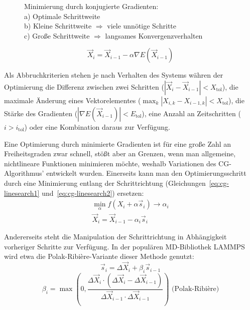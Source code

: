 \begin{figure}
  \centering
  \def\svgwidth{0.5\textwidth}
  
  \caption[Minimierung durch Konjugierte Gradienten]{
    Minimierung durch konjugierte Gradienten:\\
    a) Optimale Schrittweite\\
    b) Kleine Schrittweite $\Rightarrow$ viele unnötige Schritte\\
    c) Große Schrittweite $\Rightarrow$ langsames Konvergenzverhalten
  }
  \label{fig:cg-gradient}
\end{figure}

\begin{equation}
  \vec X_i = \vec X_{i-1} - \alpha \nabla E(\vec X_{i-1})
\end{equation}

Als Abbruchkriterien stehen je nach Verhalten des Systems währen der Optimierung die Differenz zwischen zwei Schritten ($|\vec X_i - \vec X_{i-1}| < X_\text{tol}$), die maximale Änderung eines Vektorelementes ($\max_k{|X_{i,k} - X_{i-1,k}|} < X_\text{tol}$),
die Stärke des Gradienten ($|\nabla E(\vec X_{i-1})| < E_\text{tol}$), eine Anzahl an Zeitschritten ($i > i_\text{tol}$) oder eine Kombination daraus zur Verfügung.

Eine Optimierung durch minimierte Gradienten ist für eine große Zahl an Freiheitsgraden zwar schnell, stößt aber an Grenzen, wenn man allgemeine, nichtlineare Funktionen minimieren möchte, weshalb Variationen des CG-Algorithmus' entwickelt wurden.
Einerseits kann man den Optimierungsschritt durch eine Minimierung entlang der Schrittrichtung (Gleichungen~\ref{eq:cg-linesearch1} und~\ref{eq:cg-linesearch2}) ersetzen:
\begin{gather}
  \label{eq:cg-linesearch1}
  \min_\alpha f(X_i+\alpha \vec s_i) \rightarrow \alpha_i \\
  \label{eq:cg-linesearch2}
  \vec X_i = \vec X_{i-1} - \alpha_i \vec s_i
\end{gather}

Andererseits steht die Manipulation der Schrittrichtung in Abhängigkeit vorheriger Schritte zur Verfügung.
In der populären MD-Bibliothek LAMMPS wird etwa die Polak-Ribière-Variante dieser Methode genutzt:
\begin{equation}
  \label{eq:pr1}
  \vec s_i = \Delta \vec X_i + \beta_i \vec s_{i-1}
\end{equation}
\begin{equation}
  \label{eq:pr2}
  \beta_i = \max \left(0, \frac{\Delta \vec X_i \cdot \left(\Delta \vec X_i - \Delta \vec X_{i-1}\right)}{\Delta \vec X_{i-1} \cdot \Delta \vec X_{i-1}}\right) \text{~(Polak-Ribière)}
\end{equation}

